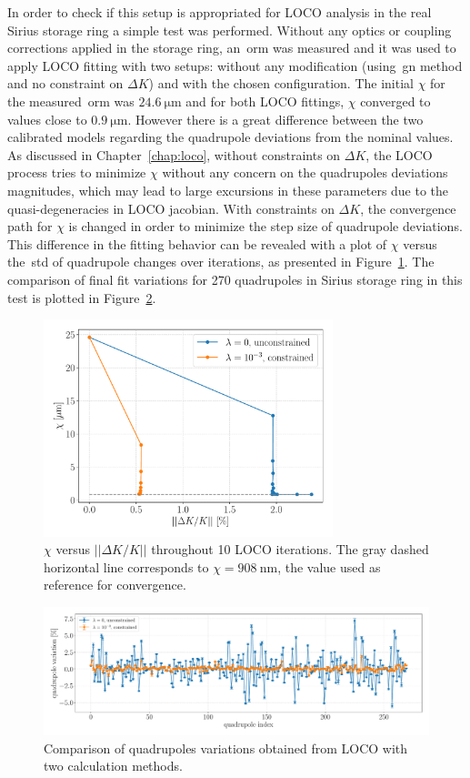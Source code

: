 In order to check if this setup is appropriated for LOCO analysis in the real Sirius storage ring a simple test was performed. Without any optics or coupling corrections applied in the storage ring, an~\gls{orm} was measured and it was used to apply LOCO fitting with two setups: without any modification (using~\gls{gn} method and no constraint on $\Delta K$) and with the chosen configuration. The initial $\chi$ for the measured~\gls{orm} was $\SI{24.6}{\micro\meter}$ and for both LOCO fittings, $\chi$ converged to values close to $\SI{0.9}{\micro\meter}$. However there is a great difference between the two calibrated models regarding the quadrupole deviations from the nominal values. As discussed in Chapter~\ref{chap:loco}, without constraints on $\Delta K$, the LOCO process tries to minimize $\chi$ without any concern on the quadrupoles deviations magnitudes, which may lead to large excursions in these parameters due to the quasi-degeneracies in LOCO jacobian. With constraints on $\Delta K$, the convergence path for $\chi$ is changed in order to minimize the step size of quadrupole deviations. This difference in the fitting behavior can be revealed with a plot of $\chi$ versus the~\gls{std} of quadrupole changes over iterations, as presented in Figure~\ref{fig:chi_vs_dkl}. The comparison of final fit variations for 270 quadrupoles in Sirius storage ring in this test is plotted in Figure~\ref{fig:dkl_compare}. 
\begin{figure}[h!]
\centering
\includegraphics[width=0.75\textwidth]{figures/chi_versus_dk_cumsum.pdf}
\caption{$\chi$ versus $||\Delta K/K||$ throughout 10 LOCO iterations. The gray dashed horizontal line corresponds to $\chi = \SI{908}{\nano\meter}$, the value used as reference for convergence.}
\label{fig:chi_vs_dkl}
\end{figure}
\begin{figure}[h!]
\centering
\includegraphics[width=1.0\textwidth]{figures/delta_kl_comparison_better_grid.pdf}
\caption{Comparison of quadrupoles variations obtained from LOCO with two calculation methods.}
\label{fig:dkl_compare}
\end{figure}

